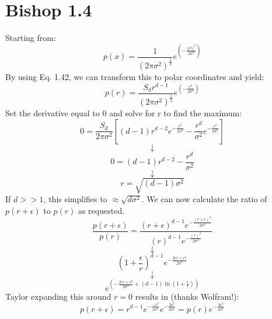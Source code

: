 \documentclass[12pt, letterpaper]{article}
\begin{document}
\section*{Bishop 1.4}
Starting from:
\begin{equation}
p(x) = \frac{1}{(2 \pi \sigma^2)^{\frac{1}{2}}} e^{(-\frac{||x||^2}{2 \sigma^2})}
\end{equation}
By using Eq. 1.42, we can transform this to polar coordinates and yield:
\begin{equation}
p(r) =  \frac{S_d r^{d-1}}{(2 \pi \sigma^2)^{\frac{1}{2}}} e^{(-\frac{r^2}{2 \sigma^2})}
\end{equation}
Set the derivative equal to $0$ and solve for r to find the maximum:
\begin{equation}
0 = \frac{S_d}{2 \pi \sigma^2} [ (d-1) r^{d-2} e^{-\frac{r^2}{2 \sigma^2}} - \frac{r^d}{\sigma^2} e^{-\frac{r^2}{2 \sigma^2}}]
\end{equation}
\begin{equation}
\downarrow
\end{equation}
\begin{equation}
0 = (d-1)r^{d-2} - \frac{r^d}{\sigma^2}
\end{equation}
\begin{equation}
\downarrow
\end{equation}
\begin{equation}
r = \sqrt{(d-1)\sigma^2}
\end{equation}
If $d >> 1$, this simplifies to $\approx \sqrt{d \sigma^2}$. We can now calculate the ratio of $p(r + \epsilon)$ to $p(r)$ as requested. 
\begin{equation}
\frac{p(r + \epsilon)}{p(r)} = \frac{(r+\epsilon)^{d-1} e^{-\frac{(r + \epsilon)^2}{2 \sigma^2}}}{(r)^{d-1} e^{-\frac{(r)^2}{2 \sigma^2}}}
\end{equation}
\begin{equation}
\downarrow
\end{equation}
\begin{equation}
(1 + \frac{\epsilon}{r})^{d-1} e^{-\frac{2 \epsilon r + \epsilon^2}{2 \sigma^2}}
\end{equation}
\begin{equation}
\downarrow
\end{equation}
\begin{equation}
e^{(-\frac{2 \epsilon r + \epsilon^2}{2 \sigma^2} + (d-1) \ln (1+\frac{\epsilon}{r}) )}
\end{equation}
Taylor expanding this around $r = 0$ results in (thanks Wolfram!):
\begin{equation}
p(r + \epsilon) = r^{d-1} e^{-\frac{-r^2}{2 \sigma^2}} e^{-\frac{3 \epsilon^2}{2 \sigma^2}} = p(r) e^{-\frac{3 \epsilon^2}{2 \sigma^2}} 
\end{equation}
\end{document}
